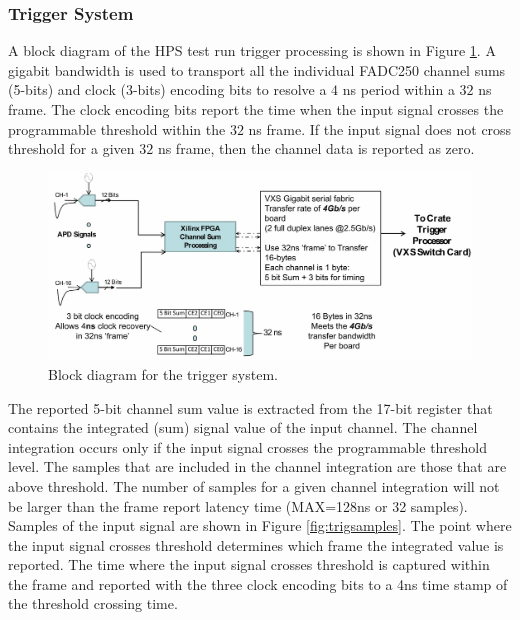 \subsubsection{Trigger System}
\label{sec:tesrun_trigger}

A block diagram of the HPS test run trigger processing is shown in Figure \ref{fig:trigger_diagram}.  A gigabit bandwidth is used to transport all the individual FADC250 channel sums (5-bits) and clock (3-bits) encoding bits to resolve a $4$ ns period within a $32$ ns frame.  The clock encoding bits report the time when the input signal crosses the programmable threshold within the $32$ ns frame.  If the input signal does not cross threshold for a given $32$ ns frame, then the channel data is reported as zero.

\begin{figure}[t]
\includegraphics[scale=0.6]{test2012/trigger/HPSChanSum_001.jpg}
\caption{\small{Block diagram for the trigger system.}}\label{fig:trigger_diagram}
\end{figure}

The reported 5-bit channel sum value is extracted from the 17-bit register that contains the integrated (sum) signal value of the input channel.  The channel integration occurs only if the input signal crosses the programmable threshold level.  The samples that are included in the channel integration are those that are above threshold.  The number of samples for a given channel integration will not be larger than the frame report latency time (MAX=128ns or 32 samples). Samples of the input signal are shown in Figure \ref{fig:trigsamples}. The point where the input signal crosses threshold determines which frame the integrated value is reported.  The time where the input signal crosses threshold is captured within the frame and reported with the three clock encoding bits to a 4ns time stamp of the threshold crossing time.

